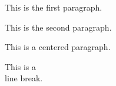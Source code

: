 
  This is the first paragraph.

  This is the second paragraph.

  \begin{center}
    This is a centered paragraph.
  \end{center}

  This is a\\
  line break.


